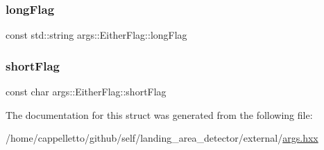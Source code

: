 \mbox{\label{structargs_1_1_either_flag_a8ae948a28b5919e82d2bbcfc999c5dda}} 
\subsubsection{\texorpdfstring{long\+Flag}{longFlag}}
{\footnotesize\ttfamily const std\+::string args\+::\+Either\+Flag\+::long\+Flag}

\mbox{\label{structargs_1_1_either_flag_a27c44f6c6d1fbd96005a3d293ff2d4e2}} 
\subsubsection{\texorpdfstring{short\+Flag}{shortFlag}}
{\footnotesize\ttfamily const char args\+::\+Either\+Flag\+::short\+Flag}



The documentation for this struct was generated from the following file\+:\begin{DoxyCompactItemize}
\item 
/home/cappelletto/github/self/landing\+\_\+area\+\_\+detector/external/\hyperlink{args_8hxx}{args.\+hxx}\end{DoxyCompactItemize}
